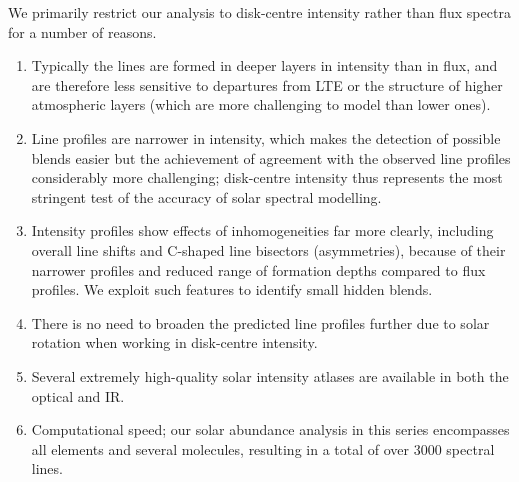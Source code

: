 \documentclass[traditabstract]{aa}
\begin{document}
We primarily restrict our analysis to disk-centre intensity rather than flux spectra for a number of reasons.\begin{enumerate}
\item Typically the lines are formed in deeper layers in intensity than in flux, and are therefore less sensitive to departures from LTE or the structure of higher atmospheric layers (which are more challenging to model than lower ones).
\item Line profiles are narrower in intensity, which makes the detection of possible blends easier but the achievement of agreement with the observed line profiles considerably more challenging; disk-centre intensity thus represents the most stringent test of the accuracy of solar spectral modelling.
\item Intensity profiles show effects of inhomogeneities far more clearly, including overall line shifts and C-shaped line bisectors (asymmetries), because of their narrower profiles and reduced range of formation depths compared to flux profiles.  We exploit such features to identify small hidden blends.
\item There is no need to broaden the predicted line profiles further due to solar rotation when working in disk-centre intensity.
\item Several extremely high-quality solar intensity atlases are available in both the optical and IR.
\item Computational speed; our solar abundance analysis in this series encompasses all elements and several molecules, resulting in a total of over $3000$ spectral lines.
\end{enumerate}
\end{document}
